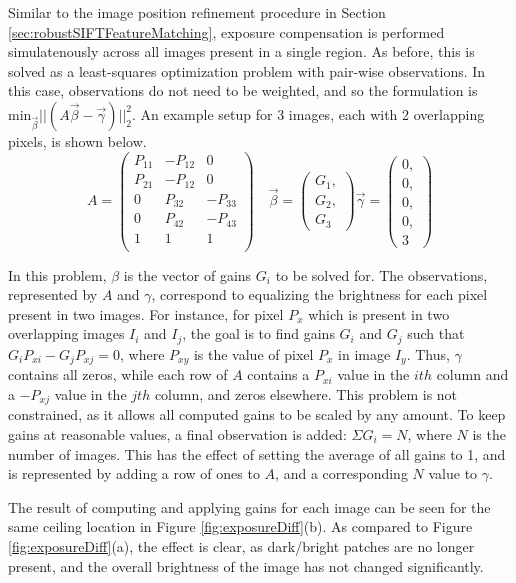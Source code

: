 \documentclass[]{spie}  %
\begin{document}
Similar to the image position refinement procedure in Section
\ref{sec:robustSIFTFeatureMatching}, exposure compensation is
performed simulatenously across all images present in a single
region. As before, this is solved as a least-squares optimization
problem with pair-wise observations. In this case, observations do not
need to be weighted, and so the formulation is
$\textrm{min}_{\vec{\beta}} ||(A \vec{\beta} - \vec{\gamma})||_2^2
$. An example setup for 3 images, each with 2 overlapping pixels, is
shown below.
\[
A =
\begin{pmatrix}
  P_{11} & -P_{12} & 0\\
  P_{21} & -P_{12} & 0\\
  0 & P_{32} & -P_{33}\\
  0 & P_{42} & -P_{43}\\
  1 & 1 & 1\\

\end{pmatrix}\quad
\vec{\beta} =
\begin{pmatrix}
  G_1, \\ G_2, \\ G_3
\end{pmatrix}
\vec{\gamma} =
\begin{pmatrix}
  0, \\ 0, \\ 0, \\ 0, \\ 3
\end{pmatrix}
\]

In this problem, $\beta$ is the vector of gains $G_i$ to be solved
for.  The observations, represented by $A$ and $\gamma$, correspond to
equalizing the brightness for each pixel present in two images. For
instance, for pixel $P_x$ which is present in two overlapping images
$I_i$ and $I_j$, the goal is to find gains $G_i$ and $G_j$ such that
$G_iP_{xi} - G_jP_{xj} = 0$, where $P_{xy}$ is the value of pixel
$P_x$ in image $I_y$. Thus, $\gamma$ contains all zeros, while each
row of $A$ contains a $P_{xi}$ value in the $ith$ column and a
$-P_{xj}$ value in the $jth$ column, and zeros elsewhere. This problem
is not constrained, as it allows all computed gains to be scaled by
any amount. To keep gains at reasonable values, a final observation is
added: $\Sigma G_i = N$, where $N$ is the number of images. This has
the effect of setting the average of all gains to 1, and is
represented by adding a row of ones to $A$, and a corresponding $N$
value to $\gamma$.

The result of computing and applying gains for each image can be seen
for the same ceiling location in Figure \ref{fig:exposureDiff}(b). As
compared to Figure \ref{fig:exposureDiff}(a), the effect is clear, as
dark/bright patches are no longer present, and the overall brightness
of the image has not changed significantly.
\end{document}

